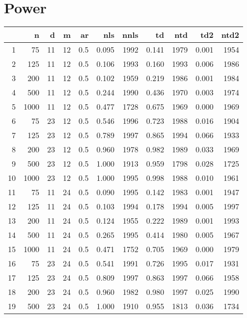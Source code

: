 \documentclass{article}
\begin{document}
\section{Power}
\begin{tabular}{rrrrrrrrrrr}
  \hline
 & n & d & m & ar & nls & nnls & td & ntd & td2 & ntd2 \\ 
  \hline
1 & 75 & 11 & 12 & 0.5 & 0.095 & 1992 & 0.141 & 1979 & 0.001 & 1954 \\ 
  2 & 125 & 11 & 12 & 0.5 & 0.106 & 1993 & 0.160 & 1993 & 0.006 & 1986 \\ 
  3 & 200 & 11 & 12 & 0.5 & 0.102 & 1959 & 0.219 & 1986 & 0.001 & 1984 \\ 
  4 & 500 & 11 & 12 & 0.5 & 0.244 & 1990 & 0.436 & 1970 & 0.003 & 1974 \\ 
  5 & 1000 & 11 & 12 & 0.5 & 0.477 & 1728 & 0.675 & 1969 & 0.000 & 1969 \\ 
   \hline
6 & 75 & 23 & 12 & 0.5 & 0.546 & 1996 & 0.723 & 1988 & 0.016 & 1904 \\ 
  7 & 125 & 23 & 12 & 0.5 & 0.789 & 1997 & 0.865 & 1994 & 0.066 & 1933 \\ 
  8 & 200 & 23 & 12 & 0.5 & 0.960 & 1978 & 0.982 & 1989 & 0.033 & 1969 \\ 
  9 & 500 & 23 & 12 & 0.5 & 1.000 & 1913 & 0.959 & 1798 & 0.028 & 1725 \\ 
  10 & 1000 & 23 & 12 & 0.5 & 1.000 & 1995 & 0.998 & 1988 & 0.010 & 1961 \\ 
   \hline
11 & 75 & 11 & 24 & 0.5 & 0.090 & 1995 & 0.142 & 1983 & 0.001 & 1947 \\ 
  12 & 125 & 11 & 24 & 0.5 & 0.103 & 1994 & 0.178 & 1994 & 0.005 & 1997 \\ 
  13 & 200 & 11 & 24 & 0.5 & 0.124 & 1955 & 0.222 & 1989 & 0.001 & 1993 \\ 
  14 & 500 & 11 & 24 & 0.5 & 0.265 & 1995 & 0.414 & 1980 & 0.005 & 1967 \\ 
  15 & 1000 & 11 & 24 & 0.5 & 0.471 & 1752 & 0.705 & 1969 & 0.000 & 1979 \\ 
   \hline
16 & 75 & 23 & 24 & 0.5 & 0.541 & 1991 & 0.726 & 1995 & 0.017 & 1931 \\ 
  17 & 125 & 23 & 24 & 0.5 & 0.809 & 1997 & 0.863 & 1997 & 0.066 & 1958 \\ 
  18 & 200 & 23 & 24 & 0.5 & 0.960 & 1982 & 0.980 & 1997 & 0.025 & 1990 \\ 
  19 & 500 & 23 & 24 & 0.5 & 1.000 & 1910 & 0.955 & 1813 & 0.036 & 1734 \\ 

\end{tabular}
\end{document}
